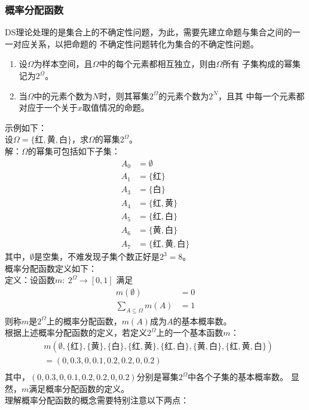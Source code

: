 \documentclass[12pt]{article}
\begin{document}
\subsubsection{概率分配函数}
DS理论处理的是集合上的不确定性问题，为此，需要先建立命题与集合之间的一一对应关系，以把命题的
不确定性问题转化为集合的不确定性问题。
\begin{enumerate}
	\item 设$\Omega$为样本空间，且$\Omega$中的每个元素都相互独立，则由$\Omega$所有
子集构成的幂集记为$2^\Omega$。
	\item 当$\Omega$中的元素个数为$N$时，则其幂集$2^\Omega$的元素个数为$2^N$，且其
中每一个元素都对应于一个关于$x$取值情况的命题。
\end{enumerate}
示例如下：\\
设$\Omega=\{红,黄,白\}$，求$\Omega$的幂集$2^\Omega$。\\
解：$\Omega$的幂集可包括如下子集：
\[
	\begin{aligned}
		A_0&=\emptyset\\
		A_1&=\{红\}\\
		A_3&=\{白\}\\
		A_4&=\{红,黄\}\\
		A_5&=\{红,白\}\\
		A_6&=\{黄,白\}\\
		A_7&=\{红,黄,白\}
	\end{aligned}	
\]
其中，$\emptyset$是空集，不难发现子集个数正好是$2^3=8$。\\
概率分配函数定义如下：\\
定义：设函数$m:\ 2^\Omega \to [0,1]$ 满足
\[
	\begin{aligned}
		m(\emptyset)&=0\\
		\sum_{A\subseteq \Omega}m(A)&=1
	\end{aligned}	
\]
则称$m$是$2^\Omega$上的概率分配函数，$m(A)$成为$A$的基本概率数。\\
根据上述概率分配函数的定义，若定义$2^\Omega$上的一个基本函数$m$：
\[
	\begin{split}
	&m(\emptyset,\{红\},\{黄\},\{白\},\{红,黄\},\{红,白\},\{黄,白\},
\{红,黄,白\})\\
	&=(0,0.3,0,0.1,0.2,0.2,0,0.2)\\
	\end{split}
\]
其中，$(0,0.3,0,0.1,0.2,0.2,0,0.2)$分别是幂集$2^\Omega$中各个子集的基本概率数。
显然，$m$满足概率分配函数的定义。\\
理解概率分配函数的概念需要特别注意以下两点：\\
\end{document}
